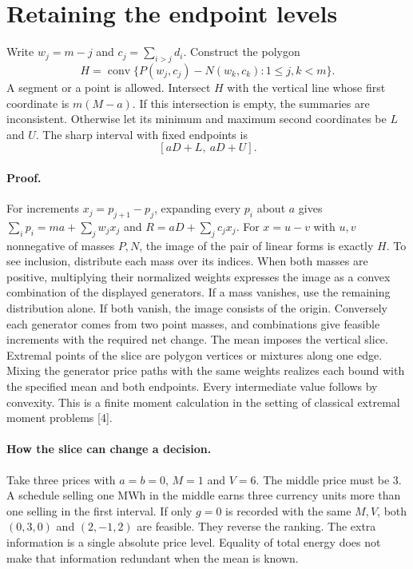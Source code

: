 \documentclass[11pt]{article}
\newcommand{\conv}{\operatorname{conv}}
\begin{document}
\newpage
\section{Retaining the endpoint levels}
Write $w_j=m-j$ and $c_j=\sum_{i>j}d_i$. Construct the polygon
\[
H=\conv\{P(w_j,c_j)-N(w_k,c_k):1\le j,k<m\}.
\]
A segment or a point is allowed. Intersect $H$ with the vertical line whose first coordinate is $m(M-a)$. If this intersection is empty, the summaries are inconsistent. Otherwise let its minimum and maximum second coordinates be $L$ and $U$. The sharp interval with fixed endpoints is
\[
                         [aD+L,\ aD+U].
\]

\paragraph{Proof.}
For increments $x_j=p_{j+1}-p_j$, expanding every $p_i$ about $a$ gives $\sum_i p_i=ma+\sum_j w_j x_j$ and $R=aD+\sum_j c_jx_j$. For $x=u-v$ with $u,v$ nonnegative of masses $P,N$, the image of the pair of linear forms is exactly $H$. To see inclusion, distribute each mass over its indices. When both masses are positive, multiplying their normalized weights expresses the image as a convex combination of the displayed generators. If a mass vanishes, use the remaining distribution alone. If both vanish, the image consists of the origin. Conversely each generator comes from two point masses, and combinations give feasible increments with the required net change. The mean imposes the vertical slice. Extremal points of the slice are polygon vertices or mixtures along one edge. Mixing the generator price paths with the same weights realizes each bound with the specified mean and both endpoints. Every intermediate value follows by convexity. This is a finite moment calculation in the setting of classical extremal moment problems [4].

\paragraph{How the slice can change a decision.}
Take three prices with $a=b=0$, $M=1$ and $V=6$. The middle price must be 3. A schedule selling one MWh in the middle earns three currency units more than one selling in the first interval. If only $g=0$ is recorded with the same $M,V$, both $(0,3,0)$ and $(2,-1,2)$ are feasible. They reverse the ranking. The extra information is a single absolute price level. Equality of total energy does not make that information redundant when the mean is known.
\end{document}

